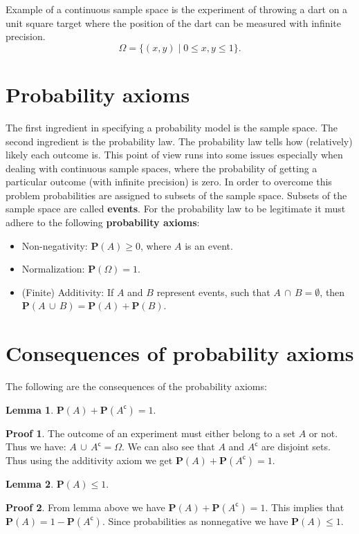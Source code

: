 \documentclass[11pt]{amsart}
\theoremstyle{definition} \newtheorem{thm}{Theorem} \theoremstyle{plain}
\theoremstyle{definition} \newtheorem*{nnthm}{Theorem} \theoremstyle{plain}
\theoremstyle{definition} \newtheorem{lem}{Lemma} \theoremstyle{plain}
\theoremstyle{definition} \newtheorem*{nnlem}{Lemma} \theoremstyle{plain}
\theoremstyle{definition} \newtheorem{prf}{Proof} \theoremstyle{plain}
\theoremstyle{definition} \newtheorem*{nnprf}{Proof} \theoremstyle{plain}
\theoremstyle{definition} \newtheorem{eg}{Example} \theoremstyle{plain}
\theoremstyle{definition} \newtheorem*{sol}{Solution} \theoremstyle{plain}
\newcommand{\setcomp}[1]{{#1}^{\mathsf{c}}}
\newcommand{\prob}[1]{\mathbf{P}(#1)}
\newcommand{\twocup}[2]{{#1} \,\cup\, {#2}}
\newcommand{\twocap}[2]{{#1} \,\cap\, {#2}}
\begin{document}
Example of a continuous sample space is the experiment of throwing a dart on a 
unit square target where the position of the dart can be measured with infinite precision. 
\begin{equation*}
\Omega = \{ (x, y) \mid 0 \leq x, y \leq 1\}.
\end{equation*}

\section{Probability axioms}
The first ingredient in specifying a probability model is the sample space. The 
second ingredient is the probability law. The probability law tells how 
(relatively) likely each outcome is. This point of view runs into some issues 
especially when dealing with continuous sample spaces, where the probability 
of getting a particular outcome (with infinite precision) is zero. In order to 
overcome this problem probabilities are assigned to subsets of the sample space. 
Subsets of the sample space are called \textbf{events}. For the probability law 
to be legitimate it must adhere to the following \textbf{probability axioms}:
\begin{itemize}
\item Non-negativity: $\prob{A} \geq 0$, where $A$ is an event.
\item Normalization: $\prob{\Omega} = 1$.
\item (Finite) Additivity: If $A$ and $B$ represent events, such that 
$\twocap{A}{B} = \emptyset $, then 
$\prob{\twocup{A}{B}} = \prob{A} + \prob{B}$.
\end{itemize}
  

\section{Consequences of probability axioms}
\noindent The following are the consequences of the probability axioms:

\begin{lem}
$\prob{A} + \prob{\setcomp{A}} = 1$.
\end{lem}
\begin{nnprf}
The outcome of an experiment must either belong to a set $A$ or 
not. Thus we have: $\twocup{A}{\setcomp{A}} = \Omega$. We can also see that 
$A$ and $\setcomp{A}$ are disjoint sets. Thus using the additivity axiom we 
get $\prob{A} + \prob{\setcomp{A}} = 1$.
\end{nnprf}

\begin{lem}
$\prob{A} \leq  1$.
\end{lem}
\begin{nnprf}
From lemma above we have $\prob{A} + \prob{\setcomp{A}} = 1$. This implies that 
$\prob{A} = 1 - \prob{\setcomp{A}}$. Since probabilities as nonnegative we have 
$\prob{A} \leq 1$. 
\end{nnprf}
\end{document}
